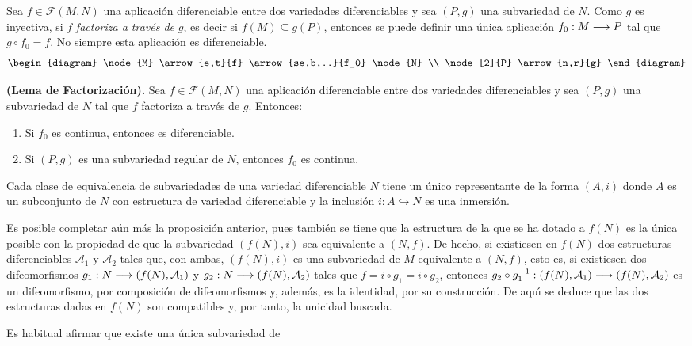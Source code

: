 \documentclass[cursovd_portada.tex]{subfiles}
\begin{document}
Sea $f\in\mathcal{F}(M,N)$ una aplicaci\'{o}n diferenciable entre
dos variedades diferenciables y sea $(P,g)$ una subvariedad de
$N$. Como $g$ es inyectiva, si $f$ {\it factoriza a trav\'{e}s de}
$g$, es decir si $f(M)\subseteq g(P)$, entonces se puede definir
una \'{u}nica aplicaci\'{o}n $f_0:M\longrightarrow P$ tal que $g\circ f_0=f$.
No siempre esta aplicaci\'{o}n es diferenciable.
$$\begin{diagram}
\node{M} \arrow{e,t}{f} \arrow{se,b,..}{f_0} \node{N} \\
\node[2]{P} \arrow{n,r}{g}
\end{diagram}$$
\begin{teorema}
{\bf (Lema de Factorizaci\'{o}n).} Sea $f\in\mathcal{F}(M,N)$ una
aplicaci\'{o}n diferenciable entre dos variedades diferenciables y
sea $(P,g)$ una subvariedad de $N$ tal que $f$ factoriza a
trav\'{e}s de $g$. Entonces:
\begin{enumerate}
\item Si $f_0$ es continua, entonces es diferenciable. \item Si
$(P,g)$ es una subvariedad regular de $N$, entonces $f_0$ es
continua.
\end{enumerate}
\end{teorema}
\begin{prop}
Cada clase de equivalencia de subvariedades de una variedad
diferenciable $N$ tiene un \'{u}nico representante de la forma
$(A,i)$ donde $A$ es un subconjunto de $N$ con estructura de
variedad diferenciable y la inclusi\'{o}n $i:A\hookrightarrow N$
es una inmersi\'{o}n.
\end{prop}
\hs Es posible completar a\'{u}n m\'{a}s la proposici\'{o}n
anterior, pues tambi\'{e}n se tiene que la estructura de la que se
ha dotado a $f(N)$ es la \'{u}nica posible con la propiedad de que
la subvariedad $(f(N),i)$ sea equivalente a $(N,f)$. De hecho, si
existiesen en $f(N)$ dos estructuras diferenciables
$\mathcal{A}_1$ y $\mathcal{A}_2$ tales que, con ambas, $(f(N),i)$
es una subvariedad de $M$ equivalente a $(N,f)$, esto es, si
existiesen dos difeomorfismos $g_1:N\longrightarrow(f(N),\mathcal{A}_1)$ y
$g_2:N\longrightarrow(f(N),\mathcal{A}_2)$ tales que $f=i\circ g_1=i\circ
g_2$, entonces $g_2\circ
g_1^{-1}:(f(N),\mathcal{A}_1)\longrightarrow(f(N),\mathcal{A}_2)$ es un
difeomorfismo, por composici\'{o}n de difeomorfismos y,
adem\'{a}s, es la identidad, por su construcci\'{o}n. De aqu\'{\i}
se deduce que las dos estructuras dadas en $f(N)$ son compatibles
y, por tanto, la unicidad buscada.
\par
\hs Es habitual afirmar que existe una \'{u}nica subvariedad de
\end{document}
